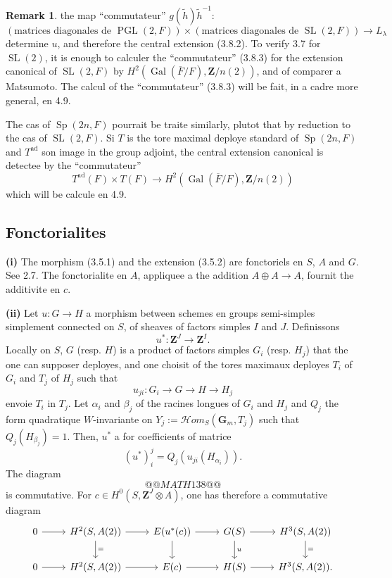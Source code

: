 \documentclass[11pt,a4paper]{article}
\theoremstyle{plain}
\theoremstyle{definition}
\newtheorem{remark}[theorem]{Remark}
\DeclareMathOperator{\Gal}{Gal}
\DeclareMathOperator{\PGL}{PGL}
\DeclareMathOperator{\SL}{SL}
\DeclareMathOperator{\Sp}{Sp}
\DeclareMathOperator{\ad}{ad}
\begin{document}
\begin{remark}
the map ``commutateur'' $g(\tilde{h}) \tilde{h}^{-1}$:
\begin{equation}\label{3.8.3}
(\text{matrices diagonales de } \PGL(2, F)) \times (\text{matrices diagonales de } \SL(2, F)) \to L_\lambda
\end{equation}
determine $u$, and therefore the central extension (3.8.2). To verify 3.7 for $\SL(2)$, it is enough to calculer the ``commutateur'' (3.8.3) for the extension canonical of $\SL(2, F)$ by $H^2(\Gal(\overline{F}/F), \mathbf{Z}/n(2))$, and of comparer a Matsumoto. The calcul of the ``commutateur'' (3.8.3) will be fait, in a cadre more general, en 4.9.

The cas of $\Sp(2n, F)$ pourrait be traite similarly, plutot that by reduction to the cas of $\SL(2, F)$. Si $T$ is the tore maximal deploye standard of $\Sp(2n, F)$ and $T^{\ad}$ son image in the group adjoint, the central extension canonical is detectee by the ``commutateur''
\[
T^{\ad}(F) \times T(F) \to H^2(\Gal(\overline{F}/F), \mathbf{Z}/n(2))
\]
which will be calcule en 4.9.
\end{remark}

\subsection{Fonctorialites}\label{3.9}

\textbf{(i)} The morphism (3.5.1) and the extension (3.5.2) are fonctoriels en $S$, $A$ and $G$. See 2.7. The fonctorialite en $A$, appliquee a the addition $A \oplus A \to A$, fournit the additivite en $c$.

\textbf{(ii)} Let $u : G \to H$ a morphism between schemes en groups semi-simples simplement connected on $S$, of sheaves of factors simples $I$ and $J$. Definissons
\begin{equation}\label{3.9.1}
u^* : \mathbf{Z}^J \to \mathbf{Z}^I.
\end{equation}
Locally on $S$, $G$ (resp. $H$) is a product of factors simples $G_i$ (resp. $H_j$) that the one can supposer deployes, and one choisit of the tores maximaux deployes $T_i$ of $G_i$ and $T_j$ of $H_j$ such that
\[
u_{ji} : G_i \to G \to H \to H_j
\]
envoie $T_i$ in $T_j$. Let $\alpha_i$ and $\beta_j$ of the racines longues of $G_i$ and $H_j$ and $Q_j$ the form quadratique $W$-invariante on $Y_j := \mathscr{H}om_S(\mathbf{G}_m, T_j)$ such that $Q_j(H_{\beta_j}) = 1$. Then, $u^*$ a for coefficients of matrice
\[
(u^*)_i^j = Q_j(u_{ji}(H_{\alpha_i})).
\]
The diagram
\[
@@MATH138@@
\]
is commutative. For $c \in H^0(S, \mathbf{Z}^J \otimes A)$, one has therefore a commutative diagram
\begin{equation}\label{3.9.2}
\begin{tikzcd}
0 \arrow{r} & H^2(S, A(2)) \arrow{r} \arrow{d}{=} & E(u^*(c)) \arrow{r} \arrow{d} & G(S) \arrow{r} \arrow{d}{u} & H^3(S, A(2)) \arrow{d}{=} \\
0 \arrow{r} & H^2(S, A(2)) \arrow{r} & E(c) \arrow{r} & H(S) \arrow{r} & H^3(S, A(2)).
\end{tikzcd}
\end{equation}
\end{document}
